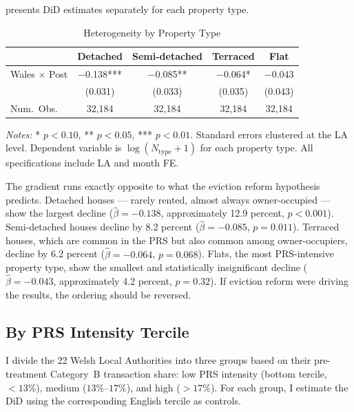 \documentclass[12pt]{article}
\begin{document}
 presents DiD estimates separately for each property type.

\begin{table}[H]
\centering
\caption{Heterogeneity by Property Type}
\label{tab:by_type}
\begin{threeparttable}
\begin{tabular}{lcccc}
\toprule
& Detached & Semi-detached & Terraced & Flat \\
\midrule
Wales $\times$ Post & $-$0.138*** & $-$0.085** & $-$0.064* & $-$0.043 \\
& (0.031) & (0.033) & (0.035) & (0.043) \\[4pt]
Num.\ Obs. & 32,184 & 32,184 & 32,184 & 32,184 \\
\bottomrule
\end{tabular}
\begin{tablenotes}[flushleft]
\small
\item \textit{Notes:} * $p<0.10$, ** $p<0.05$, *** $p<0.01$. Standard errors clustered at the LA level. Dependent variable is $\log(N_{\text{type}} + 1)$ for each property type. All specifications include LA and month FE.
\end{tablenotes}
\end{threeparttable}
\end{table}

The gradient runs exactly opposite to what the eviction reform hypothesis predicts. Detached houses --- rarely rented, almost always owner-occupied --- show the largest decline ($\hat{\beta} = -0.138$, approximately 12.9 percent, $p < 0.001$). Semi-detached houses decline by 8.2 percent ($\hat{\beta} = -0.085$, $p = 0.011$). Terraced houses, which are common in the PRS but also common among owner-occupiers, decline by 6.2 percent ($\hat{\beta} = -0.064$, $p = 0.068$). Flats, the most PRS-intensive property type, show the smallest and statistically insignificant decline ($\hat{\beta} = -0.043$, approximately 4.2 percent, $p = 0.32$). If eviction reform were driving the results, the ordering should be reversed.

\subsection{By PRS Intensity Tercile}

I divide the 22 Welsh Local Authorities into three groups based on their pre-treatment Category~B transaction share: low PRS intensity (bottom tercile, $< 13\%$), medium ($13\%$--$17\%$), and high ($> 17\%$). For each group, I estimate the DiD using the corresponding English tercile as controls.
\end{document}
